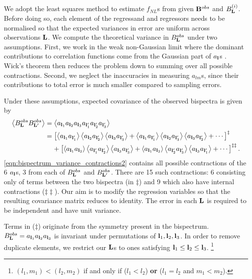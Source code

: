 We adopt the least squares method to estimate $f_{NL}$s from given $\mathbf{B}^{obs}$ and $B^{(i)}_\mathbf{L}$. Before doing so, each element of the regressand and regressors needs to be normalised so that the expected variances in error are uniform across observations $\mathbf{L}$. We compute the theoretical variance in $B^{obs}_\mathbf{L}$ under two assumptions. First, we work in the weak non-Gaussian limit where the dominant contributions to correlation functions come from the Gaussian part of $a_\mathbf{l}$s . Wick's theorem then reduces the problem down to summing over all possible contractions. Second, we neglect the inaccuracies in measuring $a_{lm}$s, since their contributions to total error is much smaller compared to sampling errors.

Under these assumptions, expected covariance of the observed bispectra is given by
\begin{align}
	\left< B^{obs}_\mathbf{L} B^{obs}_{\mathbf{L}'} \right> &= \left< a_{\mathbf{l}_1} a_{\mathbf{l}_2} a_{\mathbf{l}_3} a_{\mathbf{l}'_1} a_{\mathbf{l}'_2} a_{\mathbf{l}'_3} \right> 
	\label{eqn:bispectrum_variance_contractions1} \\
	&= \left[ \left< a_{\mathbf{l}_1} a_{\mathbf{l}'_1} \right> \left< a_{\mathbf{l}_2} a_{\mathbf{l}'_2} \right> \left< a_{\mathbf{l}_3} a_{\mathbf{l}'_3} \right> + \left< a_{\mathbf{l}_1} a_{\mathbf{l}'_1} \right> \left< a_{\mathbf{l}_2} a_{\mathbf{l}'_3} \right> \left< a_{\mathbf{l}_3} a_{\mathbf{l}'_2} \right> + \cdots \right]^\ddagger \nonumber \\
	&\;\;\;\; + \left[ \left< a_{\mathbf{l}_1} a_{\mathbf{l}_2} \right> \left< a_{\mathbf{l}'_1} a_{\mathbf{l}'_2} \right> \left< a_{\mathbf{l}_3} a_{\mathbf{l}'_3} \right> + \left< a_{\mathbf{l}_1} a_{\mathbf{l}_2} \right> \left< a_{\mathbf{l}'_2} a_{\mathbf{l}'_3} \right> \left< a_{\mathbf{l}_3} a_{\mathbf{l}'_1} \right> + \cdots \right]^{\ddagger\ddagger} \label{eqn:bispectrum_variance_contractions2}.
\end{align}
\eqref{eqn:bispectrum_variance_contractions2} contains all possible contractions of the 6 $a_\mathbf{l}$s, 3 from each of $B^{obs}_\mathbf{L}$ and $B^{obs}_{\mathbf{L}'}$. There are 15 such contractions: 6 consisting only of terms between the two bispectra (in $\ddagger$) and 9 which also have internal contractions ($\ddagger\ddagger$). Our aim is to modify the regression variables so that the resulting covariance matrix reduces to identity. The error in each $\mathbf{L}$ is required to be independent and have unit variance.

Terms in ($\ddagger$) originate from the symmetry present in the bispectrum. $B^{obs}_\mathbf{L} = a_{\mathbf{l}_1}  a_{\mathbf{l}_2}  a_{\mathbf{l}_3}$ is invariant under permutations of ${\mathbf{l}_1, \mathbf{l}_2, \mathbf{l}_3}$. In order to remove duplicate elements, we restrict our $\mathbf{L}$s to ones satisfying $\mathbf{l}_1 \le \mathbf{l}_2 \le \mathbf{l}_3$. \footnote{$(l_1,m_1) < (l_2,m_2)$ if and only if ($l_1 < l_2$) \textbf{or} ($l_1 = l_2$ and $m_1 < m_2$).}


